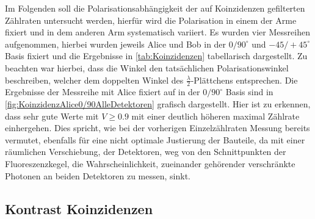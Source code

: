 \documentclass[12pt,a4paper]{article}
\begin{document}
	Im Folgenden soll die Polarisationsabhängigkeit der auf Koinzidenzen gefilterten Zählraten untersucht werden,
	hierfür wird die Polarisation in einem der Arme fixiert und in dem anderen Arm systematisch variiert.
	Es wurden vier Messreihen aufgenommen, hierbei wurden jeweils Alice und Bob
	in der \(0/90^\circ\) und \(-45/+45^\circ\) Basis fixiert und die Ergebnisse in \ref{tab:Koinzidenzen} tabellarisch
	dargestellt.
	Zu beachten war hierbei, dass die Winkel den tatsächlichen Polarisationswinkel beschreiben,
	welcher dem doppelten Winkel des \(\frac{\lambda}{2}\)-Plättchens entsprechen.
	Die Ergebnisse der Messreihe mit Alice fixiert auf in der \(0/90^\circ \) Basis sind
	in \ref{fig:KoinzidenzAlice0/90AlleDetektoren} grafisch dargestellt.
	Hier ist zu erkennen, dass sehr gute Werte mit \(V \geq 0.9\) mit einer deutlich
	höheren maximal Zählrate einhergehen. Dies spricht, wie bei der vorherigen Einzelzählraten Messung
	bereits vermutet, ebenfalls für eine nicht optimale Justierung der Bauteile, da mit einer räumlichen Verschiebung, der
	Detektoren, weg von den Schnittpunkten der Fluoreszenzkegel, die Wahrscheinlichkeit,
	zueinander gehörender verschränkte Photonen an beiden Detektoren zu messen, sinkt.


	\subsection{Kontrast Koinzidenzen}
\end{document}
